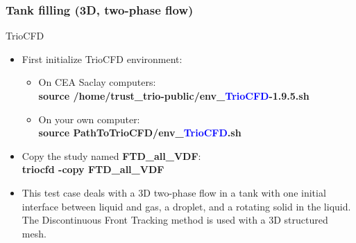 \documentclass[10pt, hyperref={unicode=true,pdfusetitle, bookmarks=true,bookmarksnumbered=false,bookmarksopen=false, breaklinks=false,pdfborder={0 0l 1},backref=true,colorlinks=true,linkcolor=darkblue,pageanchor}]{beamer}
\begin{document}
\begin{frame}
\frametitle{Tank filling (3D, two-phase flow)}
\begin{block}{TrioCFD}

\begin{itemize}
\item First initialize TrioCFD environment:\\
{\small{
\begin{itemize}
\item On CEA Saclay computers:\\
\textbf{source /home/trust\_trio-public/env\_\textcolor{blue}{TrioCFD}-1.9.5.sh }

\item On your own computer:\\
\textbf{source PathToTrioCFD/env\_\textcolor{blue}{TrioCFD}.sh}

\end{itemize}
}}

\item Copy the study named \textbf{FTD\_all\_VDF}:\\
 \textbf{triocfd -copy FTD\_all\_VDF}

\item This test case deals with a 3D two-phase flow in a tank with one initial interface between liquid and gas, a droplet, and a rotating solid in the liquid. The Discontinuous Front Tracking method is used with a 3D structured mesh.

\end{itemize}

\end{block}
\end{frame}
\end{document}
